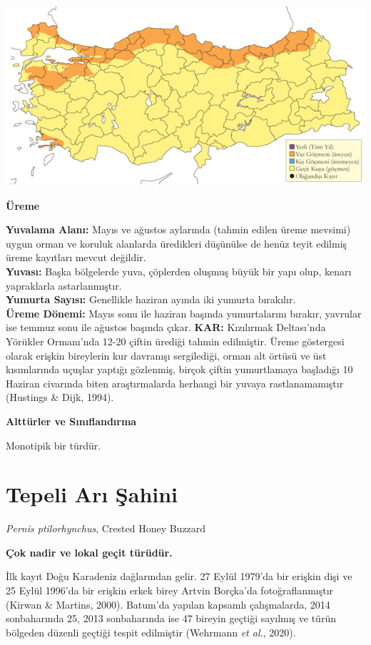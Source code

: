 \documentclass[
  a4paper,
  DIV=11,
  numbers=noendperiod]{scrreprt}
\begin{document}
\includegraphics{images/harita_Page_085.png}

\textbf{Üreme}

\textbf{Yuvalama Alanı:} Mayıs ve ağustos aylarında (tahmin edilen üreme
mevsimi) uygun orman ve koruluk alanlarda üredikleri düşünülse de henüz
teyit edilmiş üreme kayıtları mevcut değildir.\\
\textbf{Yuvası:} Başka bölgelerde yuva, çöplerden oluşmuş büyük bir yapı
olup, kenarı yapraklarla astarlanmıştır.\\
\textbf{Yumurta Sayısı:} Genellikle haziran ayında iki yumurta
bırakılır.\\
\textbf{Üreme Dönemi:} Mayıs sonu ile haziran başında yumurtalarını
bırakır, yavrular ise temmuz sonu ile ağustos başında çıkar.
\textbf{KAR:} Kızılırmak Deltası'nda Yörükler Ormanı'nda 12-20 çiftin
ürediği tahmin edilmiştir. Üreme göstergesi olarak erişkin bireylerin
kur davranışı sergilediği, orman alt örtüsü ve üst kısımlarında uçuşlar
yaptığı gözlenmiş, birçok çiftin yumurtlamaya başladığı 10 Haziran
civarında biten araştırmalarda herhangi bir yuvaya rastlanamamıştır
(Hustings \& Dijk, 1994).

\textbf{Alttürler ve Sınıflandırma}

Monotipik bir türdür.

\section{Tepeli Arı Şahini}\label{tepeli-arux131-ux15fahini}

\emph{Pernis ptilorhynchus}, Crested Honey Buzzard

\textbf{Çok nadir ve lokal geçit türüdür.}

İlk kayıt Doğu Karadeniz dağlarından gelir. 27 Eylül 1979'da bir erişkin
dişi ve 25 Eylül 1996'da bir erişkin erkek birey Artvin Borçka'da
fotoğraflanmıştır (Kirwan \& Martins, 2000). Batum'da yapılan kapsamlı
çalışmalarda, 2014 sonbaharında 25, 2013 sonbaharında ise 47 bireyin
geçtiği sayılmış ve türün bölgeden düzenli geçtiği tespit edilmiştir
(Wehrmann \emph{et al.}, 2020).
\end{document}
